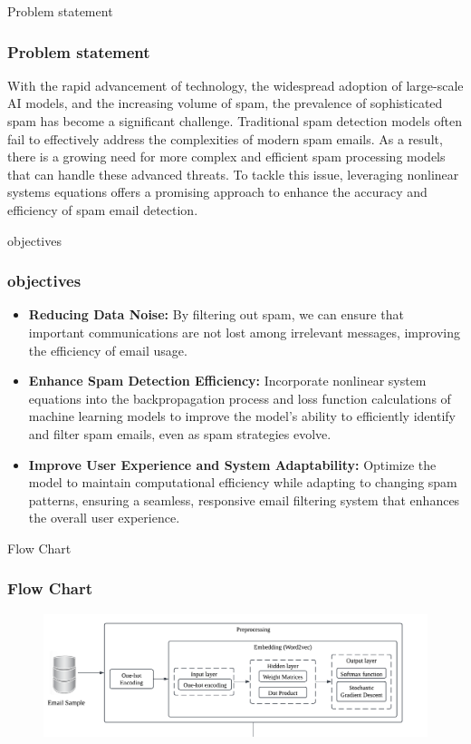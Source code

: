 \documentclass[aspectratio=1610]{beamer}
\begin{document}
\begin{frame}{Problem statement}
    \frametitle{Problem statement}
    With the rapid advancement of technology, the widespread adoption of large-scale AI models, and the increasing volume of spam, the prevalence of sophisticated spam has become a significant challenge. Traditional spam detection models often fail to effectively address the complexities of modern spam emails. As a result, there is a growing need for more complex and efficient spam processing models that can handle these advanced threats. To tackle this issue, leveraging nonlinear systems equations offers a promising approach to enhance the accuracy and efficiency of spam email detection.    
    
\end{frame}


\begin{frame}{objectives}
    \frametitle{objectives}
    \begin{itemize}
        \item \textbf{Reducing Data Noise: }By filtering out spam, we can ensure that important communications are not lost among irrelevant messages, improving the efficiency of email usage.
        \item\textbf{Enhance Spam Detection Efficiency: }Incorporate nonlinear system equations into the backpropagation process and loss function calculations of machine learning models to improve the model's ability to efficiently identify and filter spam emails, even as spam strategies evolve.
        \item\textbf{Improve User Experience and System Adaptability: } Optimize the model to maintain computational efficiency while adapting to changing spam patterns, ensuring a seamless, responsive email filtering system that enhances the overall user experience.
    \end{itemize}
    
\end{frame}


\begin{frame}{Flow Chart}
    \frametitle{Flow Chart }
    \begin{figure}
        \centering
        \includegraphics[width = 1.1\linewidth]{NA (1)[2]}
        \label{fig:figure}
    \end{figure}
    
\end{frame}
\end{document}
